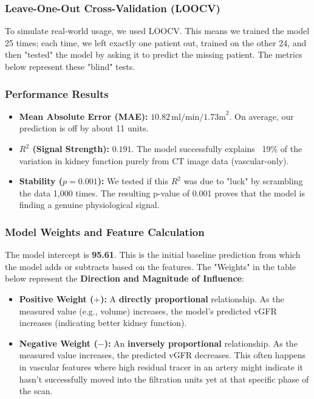 \documentclass[11pt,a4paper]{article}
\begin{document}
\subsubsection{Leave-One-Out Cross-Validation (LOOCV)}
To simulate real-world usage, we used LOOCV. This means we trained the model 25 times; each time, we left exactly one patient out, trained on the other 24, and then "tested" the model by asking it to predict the missing patient. The metrics below represent these "blind" tests.

\subsubsection{Performance Results}
\begin{itemize}
    \item \textbf{Mean Absolute Error (MAE):} $10.82 \, \text{ml/min/1.73m}^2$. On average, our prediction is off by about 11 units.
    \item \textbf{$R^2$ (Signal Strength):} $0.191$. The model successfully explains ~19\% of the variation in kidney function purely from CT image data (vascular-only).
    \item \textbf{Stability ($p=0.001$):} We tested if this $R^2$ was due to "luck" by scrambling the data 1,000 times. The resulting p-value of 0.001 proves that the model is finding a genuine physiological signal.
\end{itemize}

\subsubsection{Model Weights and Feature Calculation}
The model intercept is \textbf{95.61}. This is the initial baseline prediction from which the model adds or subtracts based on the features. The "Weights" in the table below represent the \textbf{Direction and Magnitude of Influence}:

\begin{itemize}
    \item \textbf{Positive Weight ($+$):} A \textbf{directly proportional} relationship. As the measured value (e.g., volume) increases, the model's predicted vGFR increases (indicating better kidney function).
    \item \textbf{Negative Weight ($-$):} An \textbf{inversely proportional} relationship. As the measured value increases, the predicted vGFR decreases. This often happens in vascular features where high residual tracer in an artery might indicate it hasn't successfully moved into the filtration units yet at that specific phase of the scan.
\end{itemize}
\end{document}
